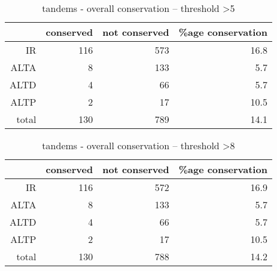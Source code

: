 \documentclass{article}
\begin{document}
\begin{table}[ht]
\centering
\begin{tabular}{rrrr}
  \hline
 & conserved & not conserved & \%age conservation \\ 
  \hline
IR & 116 & 573 & 16.8 \\ 
  ALTA & 8 & 133 & 5.7 \\ 
  ALTD & 4 & 66 & 5.7 \\ 
  ALTP & 2 & 17 & 10.5 \\ 
  total & 130 & 789 & 14.1 \\ 
   \hline
\end{tabular}
\caption{tandems - overall conservation – threshold >5} 
\end{table}%
\begin{table}[ht]
\centering
\begin{tabular}{rrrr}
  \hline
 & conserved & not conserved & \%age conservation \\ 
  \hline
IR & 116 & 572 & 16.9 \\ 
  ALTA & 8 & 133 & 5.7 \\ 
  ALTD & 4 & 66 & 5.7 \\ 
  ALTP & 2 & 17 & 10.5 \\ 
  total & 130 & 788 & 14.2 \\ 
   \hline
\end{tabular}
\caption{tandems - overall conservation – threshold >8} 
\end{table}
\end{document}
